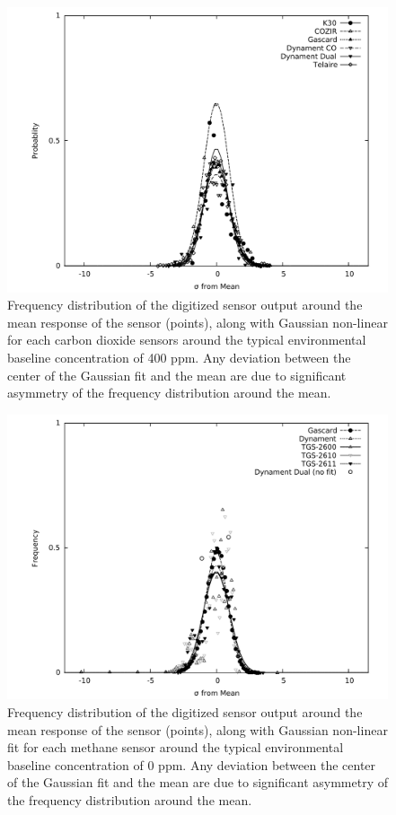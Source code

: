 \documentclass[sensors,article,submit,moreauthors,pdftex]{Definitions/mdpi}
\begin{document}
	
			\begin{figure}[!t]
				\centering
				\includegraphics[width=\columnwidth]{honey7.pdf}
				\caption{Frequency distribution of the digitized sensor output around the mean response of the sensor (points), along with Gaussian non-linear for each carbon dioxide sensors around the typical environmental baseline concentration of 400 ppm.
				Any deviation between the center of the Gaussian fit and the mean are due to significant asymmetry of the frequency distribution around the mean.}
				\label{fig:gaussco2}
			\end{figure}
			
			\begin{figure}[!t]
				\centering
				\includegraphics[width=\columnwidth]{honey8.pdf}
				\caption{Frequency distribution of the digitized sensor output around the mean response of the sensor (points), along with Gaussian non-linear fit for each methane sensor around the typical environmental baseline concentration of 0 ppm.
				Any deviation between the center of the Gaussian fit and the mean are due to significant asymmetry of the frequency distribution around the mean.}
				\label{fig:gaussch4}
			\end{figure}
			
\end{document}
